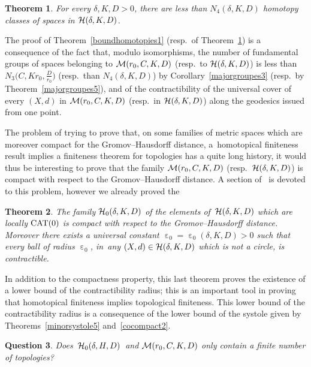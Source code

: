 \documentclass[pdftex]{sigma}
\numberwithin{equation}{section}
\newtheorem{theor}{Theorem}[section]
\newtheorem{question}[theor]{Question}
\newcommand{\e}{\operatorname{\varepsilon}}
\begin{document}
\begin{theor}\label{boundhomotopies2}
For every $ \delta, K, D >0$, there are less than $N_4 \left(\delta, K,
D \right)$ homotopy classes of
spaces in ${\cal H} (\delta, K, D)$.
\end{theor}

The proof of Theorem~\ref{boundhomotopies1} (resp.\ of Theorem~\ref{boundhomotopies2}) is a consequence of the fact that, modulo isomorphisms,
the number of fundamental groups of spaces belonging to ${\cal M} (r_0, C, K, D)$ (resp.\ to ${\cal H} (\delta, K, D)$) is less than $N_3 \big(C, K r_0, \frac{D}{r_0}\big)$ (resp.\ than
$N_4 (\delta, K, D)$) by Corollary~\ref{majorgroupes3} (resp.\ by Theorem~\ref{majorgroupes5}), and of the contractibility of the universal cover
of every $(X,d)$ in ${\cal M} (r_0, C, K, D)$ (resp.\ in ${\cal H} (\delta, K, D)$) along the geodesics issued from one point.

\medskip

The problem of trying to prove that, on some families of metric spaces which are moreover compact for the Gromov--Hausdorff distance, a~homotopical
finiteness result implies a finiteness theorem for topologies has a quite
long history, it would thus be interesting to prove that
the family ${\cal M} (r_0, C, K, D)$ (resp.\ ${\cal H} (\delta, K, D)$) is compact with respect to the Gromov--Hausdorff distance. A section of~\cite{BCGS2} is devoted to this problem, however we already proved the

\begin{theor}\label{GHcompactness}
The family ${\cal H}_0 (\delta, K, D)$ of the elements of~${\cal H} (\delta, K, D)$ which are locally ${\rm CAT}(0)$ is compact with respect to the Gromov--Hausdorff distance.
Moreover there exists a universal constant $\e_0 = \e_0 (\delta, K, D)
> 0$ such that every ball of radius $\e_0$, in~any $(X,d) \in {\cal H} (\delta, K, D)$
which is not a circle, is contractible.
\end{theor}

In addition to the compactness property, this last theorem proves the existence of a lower bound of the contractibility radius; this is an important tool in
proving that homotopical finiteness implies topological finiteness. This lower bound of the contractibility radius is a consequence of the lower bound of the systole
given by Theorems~\ref{minorsystole5} and~\ref{cocompact2}.

\begin{question}
Does $\,{\cal H}_{0} (\delta,H,D)\,$ and ${\cal M} (r_0, C, K, D)$ only contain a finite number of topo\-logies?
\end{question}
\end{document}
